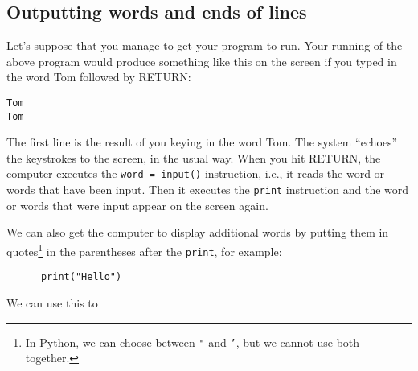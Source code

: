 

\subsection{Outputting words and ends of lines}


Let's suppose that you manage to %
get your program to run.
Your running of the above program
would produce something like this on the screen if you typed in
the word Tom followed by RETURN: 

\begin{Verbatim}
Tom
Tom
\end{Verbatim}

The first line is the result of you keying in the word Tom.  The system ``echoes''
the keystrokes to the screen, in the usual way.  When you hit RETURN, the
computer executes the \verb!word = input()! instruction, 
i.e., it reads the word or words that have been input.  Then it
executes the \verb!print! instruction and the word or words that were
input appear on the screen again.

We can also get the computer to display additional words by putting
them in quotes\footnote{In Python, we can choose between \texttt{"} and \texttt{'}, but we cannot use both together.}
in the parentheses after the \verb!print!, for example:

\begin{Verbatim}
      print("Hello")
\end{Verbatim}

We can use this to

